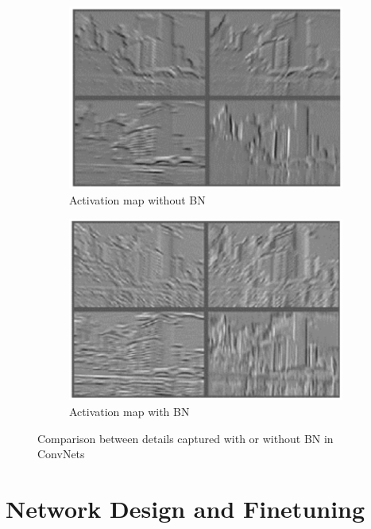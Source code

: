 \begin{figure}[ht]
\centering
\begin{subfigure}[b]{0.5\textwidth}
    \includegraphics[width=\linewidth]{img/accmapNoBN.png}
    \caption{Activation map without BN}
\end{subfigure}%
\begin{subfigure}[b]{0.5\textwidth}
    \includegraphics[width=\linewidth]{img/accmapBN.png}
    \caption{Activation map with BN}
\end{subfigure}
\caption{Comparison between details captured with or without BN in ConvNets}
\label{fig:accMapCompare}
\end{figure}


\section{Network Design and Finetuning}

